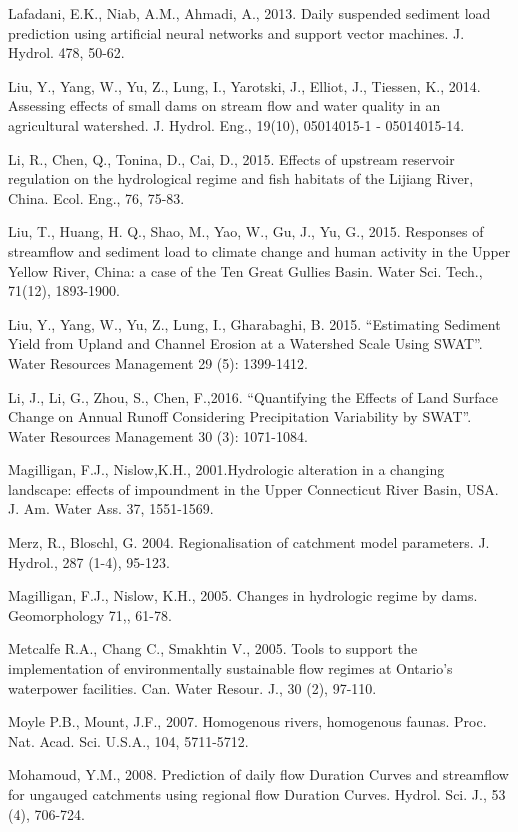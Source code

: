 \begin{hangingpar}{2em}
Lafadani, E.K., Niab, A.M., Ahmadi, A., 2013. Daily suspended sediment load prediction using artificial neural networks and support vector machines. J. Hydrol. 478, 50-62. 

Liu, Y., Yang, W., Yu, Z., Lung, I., Yarotski, J., Elliot, J., Tiessen, K., 2014. Assessing effects of small dams on stream flow and water quality in an agricultural watershed. J. Hydrol. Eng., 19(10), 05014015-1 - 05014015-14.

Li, R., Chen, Q., Tonina, D., Cai, D.,  2015. Effects of upstream reservoir regulation on the hydrological regime and fish habitats of the Lijiang River, China. Ecol. Eng., 76, 75-83.

Liu, T., Huang, H. Q., Shao, M., Yao, W., Gu, J., Yu, G., 2015. Responses of streamflow and sediment load to climate change and human activity in the Upper Yellow River, China: a case of the Ten Great Gullies Basin. Water Sci. Tech., 71(12), 1893-1900.

Liu, Y., Yang, W., Yu, Z., Lung, I., Gharabaghi, B. 2015. ``Estimating Sediment Yield from Upland and Channel Erosion at a Watershed Scale Using SWAT''.   Water Resources Management 29 (5): 1399-1412.

Li, J., Li, G., Zhou, S., Chen, F.,2016. ``Quantifying the Effects of Land Surface Change on Annual Runoff Considering Precipitation Variability by SWAT''. Water Resources Management 30 (3): 1071-1084.

Magilligan, F.J., Nislow,K.H., 2001.Hydrologic alteration in a changing landscape: effects of impoundment in the Upper Connecticut River Basin, USA. J. Am. Water Ass. 37, 1551-1569.

Merz, R., Bloschl, G. 2004.  Regionalisation of catchment model parameters.  J. Hydrol., 287 (1-4), 95-123.

Magilligan, F.J., Nislow, K.H., 2005. Changes in hydrologic regime by dams. Geomorphology 71,, 61-78.

Metcalfe R.A., Chang C., Smakhtin V., 2005. Tools to support the implementation of environmentally sustainable flow regimes at Ontario’s waterpower facilities. Can. Water Resour. J., 30 (2), 97-110.

Moyle P.B., Mount, J.F., 2007.  Homogenous rivers, homogenous faunas. Proc. Nat. Acad. Sci. U.S.A., 104, 5711-5712.

Mohamoud, Y.M., 2008. Prediction of daily flow Duration Curves and streamflow for ungauged catchments using regional flow Duration Curves. Hydrol. Sci. J., 53 (4), 706-724.


\end{hangingpar}
